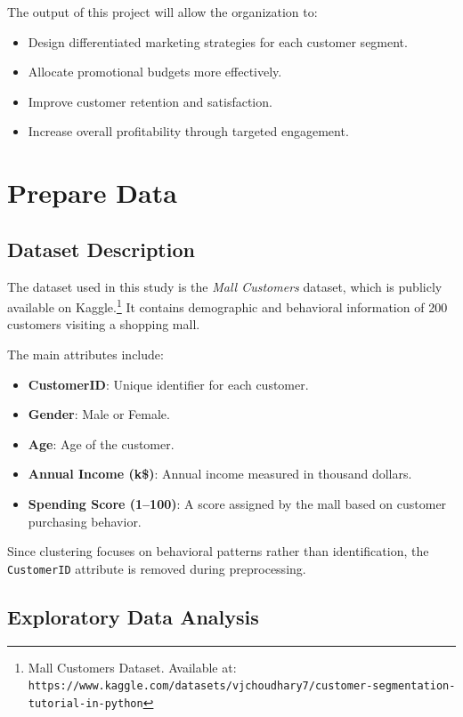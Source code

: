\documentclass[12pt,a4paper]{article}
\begin{document}
The output of this project will allow the organization to:

\begin{itemize}
    \item Design differentiated marketing strategies for each customer segment.
    \item Allocate promotional budgets more effectively.
    \item Improve customer retention and satisfaction.
    \item Increase overall profitability through targeted engagement.
\end{itemize}


\section{Prepare Data}

\subsection{Dataset Description}

The dataset used in this study is the \textit{Mall Customers} dataset, which is publicly available on Kaggle.\footnote{Mall Customers Dataset. Available at: \texttt{https://www.kaggle.com/datasets/vjchoudhary7/customer-segmentation-tutorial-in-python}} It contains demographic and behavioral information of 200 customers visiting a shopping mall.

The main attributes include:

\begin{itemize}
    \item \textbf{CustomerID}: Unique identifier for each customer.
    \item \textbf{Gender}: Male or Female.
    \item \textbf{Age}: Age of the customer.
    \item \textbf{Annual Income (k\$)}: Annual income measured in thousand dollars.
    \item \textbf{Spending Score (1--100)}: A score assigned by the mall based on customer purchasing behavior.
\end{itemize}

Since clustering focuses on behavioral patterns rather than identification, the \texttt{CustomerID} attribute is removed during preprocessing.

\subsection{Exploratory Data Analysis}
\end{document}
